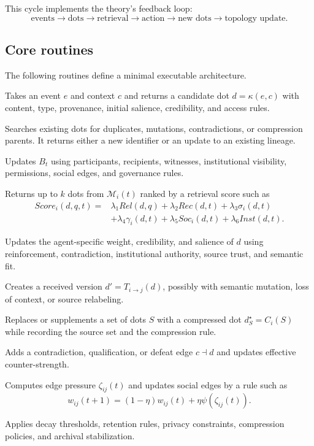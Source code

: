 \documentclass[11pt]{article}
\theoremstyle{remark}
\begin{document}
This cycle implements the theory's feedback loop:
$$
\text{events}\rightarrow\text{dots}\rightarrow\text{retrieval}\rightarrow
\text{action}\rightarrow\text{new dots}\rightarrow\text{topology update}.
$$

\subsection{Core routines}\label{core-routines}

The following routines define a minimal executable architecture.

\begin{description}[leftmargin=3.2cm,style=nextline]
\item[CreateDot$(e,c)$] Takes an event $e$ and context $c$ and returns a
candidate dot $d=\kappa(e,c)$ with content, type, provenance, initial
salience, credibility, and access rules.
\item[Canonicalize$(d,D_t)$] Searches existing dots for duplicates,
mutations, contradictions, or compression parents. It returns either a
new identifier or an update to an existing lineage.
\item[GrantAccess$(d,A,E_t,P_t)$] Updates $B_t$ using participants,
recipients, witnesses, institutional visibility, permissions, social
edges, and governance rules.
\item[Retrieve$(i,q,k)$] Returns up to $k$ dots from $\mathcal M_i(t)$ ranked by a
retrieval score such as
$$
\begin{aligned}
Score_i(d,q,t)=&\lambda_1Rel(d,q)+\lambda_2Rec(d,t)+\lambda_3\sigma_i(d,t)\\
&+\lambda_4\gamma_i(d,t)+\lambda_5Soc_i(d,t)+\lambda_6Inst(d,t).
\end{aligned}
$$
\item[Assimilate$(i,d)$] Updates the agent-specific weight, credibility,
and salience of $d$ using reinforcement, contradiction, institutional
authority, source trust, and semantic fit.
\item[Transmit$(i,j,d)$] Creates a received version $d'=T_{i\to j}(d)$,
possibly with semantic mutation, loss of context, or source relabeling.
\item[Compress$(i,S)$] Replaces or supplements a set of dots $S$ with a
compressed dot $d_S^\star=C_i(S)$ while recording the source set and the
compression rule.
\item[Correct$(c,d)$] Adds a contradiction, qualification, or defeat edge
$c\dashv d$ and updates effective counter-strength.
\item[UpdateEdges$(E_t,D_t,B_t)$] Computes edge pressure $\zeta_{ij}(t)$ and
updates social edges by a rule such as
$$
w_{ij}(t+1)=(1-\eta)w_{ij}(t)+\eta\psi(\zeta_{ij}(t)).
$$
\item[PruneArchive$(D_t,P_t)$] Applies decay thresholds, retention rules,
privacy constraints, compression policies, and archival stabilization.
\end{description}
\end{document}

